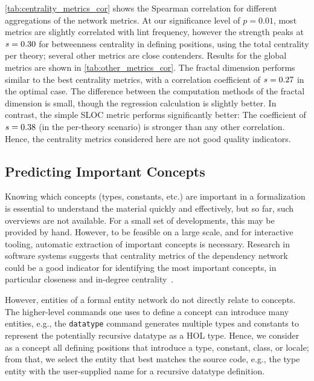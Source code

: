 
\autoref{tab:centrality_metrics_cor} shows the Spearman correlation for different aggregations of the network metrics.
At our significance level of $p=0.01$,
most metrics are slightly correlated with lint frequency,
however the strength peaks at $s=\num[round-mode=places,round-precision=2]{\lintCorrelationOptS}$ for betweenness centrality in defining positions, using the total centrality per theory;
several other metrics are close contenders.
Results for the global metrics are shown in \autoref{tab:other_metrics_cor}.
The fractal dimension performs similar to the best centrality metrics,
with a correlation coefficient of $s=\num[round-mode=places,round-precision=2]{\lintCorrelationDlOptS}$ in the optimal case.
The difference between the computation methods of the fractal dimension is small,
though the regression calculation is slightly better.
In contrast, the simple SLOC metric performs significantly better:
The coefficient of $s=\num[round-mode=places,round-precision=2]{\lintCorrelationSlocOptS}$ (in the per-theory scenario) is stronger than any other correlation.
Hence, the centrality metrics considered here are not good quality indicators.



\subsection{Predicting Important Concepts}
Knowing which concepts
(types, constants, etc.)
are important in a formalization is essential to understand the material quickly and effectively,
but so far, such overviews are not available.
For a small set of developments, this may be provided by hand.
However, to be feasible on a large scale, and for interactive tooling,
automatic extraction of important concepts is necessary.
Research in software systems suggests that centrality metrics of the dependency network could be a good indicator for identifying the most important concepts,
in particular closeness and in-degree centrality~\cite{DefectsMetrics2008Zimmermann}.

However, entities of a formal entity network do not directly relate to concepts.
The higher-level commands one uses to define a concept can introduce many entities,
e.g., the \texttt{datatype} command generates multiple types and constants to represent the potentially recursive datatype as a HOL type.
Hence, we consider as a concept all defining positions that introduce a type, constant, class, or locale;
from that, we select the entity that best matches the source code,
e.g., the type entity with the user-supplied name for a recursive datatype definition.

